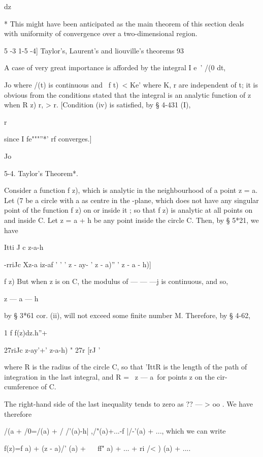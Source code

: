 {{dz



* This might have been anticipated as the main theorem of this section
deals with uniformity of convergence over a two-dimensional region.



5 -3 1-5 -4] Taylor's, Laurent's and liouville's theorems 93

A case of very great importance is afforded by the integral I e~' /(0
dt,

Jo where /(t) is continuous and \ f t)\ < Ke' where K, r are
independent of t; it is obvious from the conditions stated that the
integral is an analytic function of z when R z) r, > r. [Condition
(iv) is satisfied, by § 4-431 (I),

r

since I fe"""''*' rf converges.]

Jo

5-4. Taylor's Theorem*.

Consider a function f z), which is analytic in the neighbourhood of a
point z = a. Let (7 be a circle with a as centre in the -plane, which
does not have any singular point of the function f z) on or inside it
; so that f z) is analytic at all points on and inside C. Let z = a +
h be any point inside the circle C. Then, by § 5*21, we have

    Itti J c z-a-h

 -rriJc Xz-a iz-af ' ' ' z - ay- ' z - a)'' ' z - a - h)]

f z) But when z is on C, the modulus of — — —j is continuous, and so,

z — a — h

by § 3*61 cor. (ii), will not exceed some finite number M. Therefore,
by § 4-62,



1 f f(z)dz.h''+



27riJc z-ay'+' z-a-h) " 27r [rJ '

where R is the radius of the circle C, so that 'IttR is the length of
the path of integration in the last integral, and R = \ z — a\ for
points z on the cir- cumference of C.

The right-hand side of the last inequality tends to zero as ?? — > oo
. We have therefore

/(a + /0=/(a) + / /'(a)-h| ,/"(a)+...-f |/-'(a) + ..., which we can
write

f(z)=f a) + (z - a)/' (a) + ~ ~ff" a) + ... + ri /< ) (a) + ....

}}
